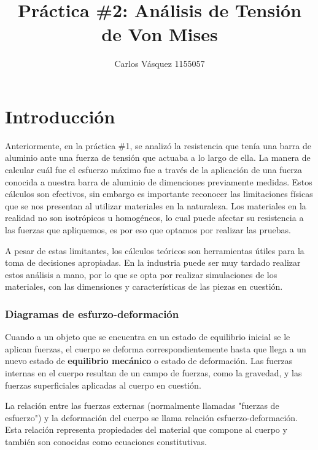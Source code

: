\documentclass[12pt, letterpaper]{article}
\title{Práctica \#2: Análisis de Tensión de Von Mises}
\author{Carlos Vásquez 1155057}
\begin{document}
\maketitle
\section*{Introducción}

Anteriormente, en la práctica \#1, se analizó la resistencia que tenía una barra de aluminio ante una fuerza de tensión que actuaba a lo largo de ella. La manera de calcular cuál fue el esfuerzo máximo fue a través de la aplicación de una fuerza conocida a nuestra barra de aluminio de dimenciones previamente medidas. Estos cálculos son efectivos, sin embargo es importante reconocer las limitaciones físicas que se nos presentan al utilizar materiales en la naturaleza. Los materiales en la realidad no son isotrópicos u homogéneos, lo cual puede afectar su resistencia a las fuerzas que apliquemos, es por eso que optamos por realizar las pruebas.

A pesar de estas limitantes, los cálculos teóricos son herramientas útiles para la toma de decisiones apropiadas. En la industria puede ser muy tardado realizar estos análisis a mano, por lo que se opta por realizar simulaciones de los materiales, con las dimensiones y características de las piezas en cuestión.
\subsubsection*{Diagramas de esfurzo-deformación}
Cuando a un objeto que se encuentra en un estado de equilibrio inicial se le aplican fuerzas, el cuerpo se deforma correspondientemente hasta que llega a un nuevo estado de \textbf{equilibrio mecánico} o estado de deformación. Las fuerzas internas en el cuerpo resultan de un campo de fuerzas, como la gravedad, y las fuerzas superficiales aplicadas al cuerpo en cuestión. 

La relación entre las fuerzas externas (normalmente llamadas "fuerzas de esfuerzo") y la deformación del cuerpo se llama relación esfuerzo-deformación. Esta relación representa propiedades del material que compone al cuerpo y también son conocidas como ecuaciones constitutivas.\autocite{sim16}
\end{document}
